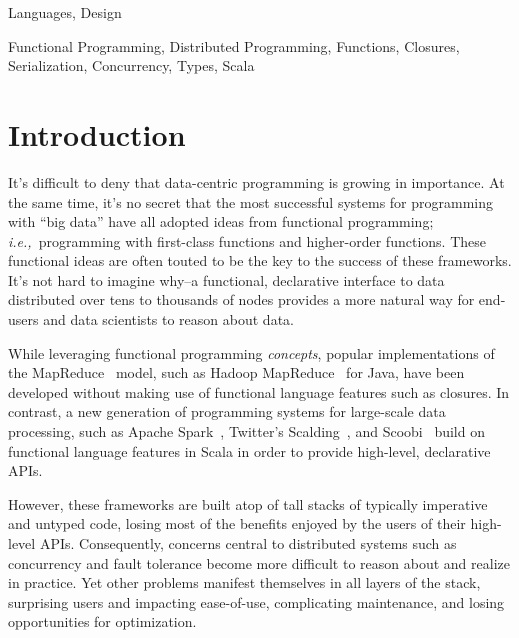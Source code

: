 \documentclass[preprint]{sigplanconf}
\theoremstyle{definition}
\theoremstyle{definition}
\newcommand{\ie}{{\em i.e.,~}}
\begin{document}
\terms
Languages, Design

\keywords
Functional Programming, Distributed Programming, Functions, Closures,
Serialization, Concurrency, Types, Scala

\section{Introduction}

It's difficult to deny that data-centric programming is growing in importance.
At the same time, it's no secret that the most successful systems for
programming with ``big data'' have all adopted ideas from functional
programming; \ie programming with first-class functions and higher-order
functions. These functional ideas are often touted to be the key to the
success of these frameworks. It's not hard to imagine why--a functional,
declarative interface to data distributed over tens to thousands of nodes
provides a more natural way for end-users and data scientists to reason about
data.

While leveraging functional programming {\em concepts}, popular
implementations of the MapReduce~\cite{MapReduce} model, such as Hadoop
MapReduce~\cite{Hadoop} for Java, have been developed without making use of
functional language features such as closures. In contrast, a new generation
of programming systems for large-scale data processing, such as Apache
Spark~\cite{Spark}, Twitter's Scalding~\cite{Scalding}, and
Scoobi~\cite{Scoobi} build on functional language features in Scala in order
to provide high-level, declarative APIs.




However, these frameworks are built atop of tall stacks of typically
imperative and untyped code, losing most of the benefits enjoyed by the users
of their high-level APIs. Consequently, concerns central to distributed
systems such as concurrency and fault tolerance become more difficult to
reason about and realize in practice. Yet other problems manifest themselves
in all layers of the stack, surprising users and impacting ease-of-use,
complicating maintenance, and losing opportunities for optimization.
\end{document}
